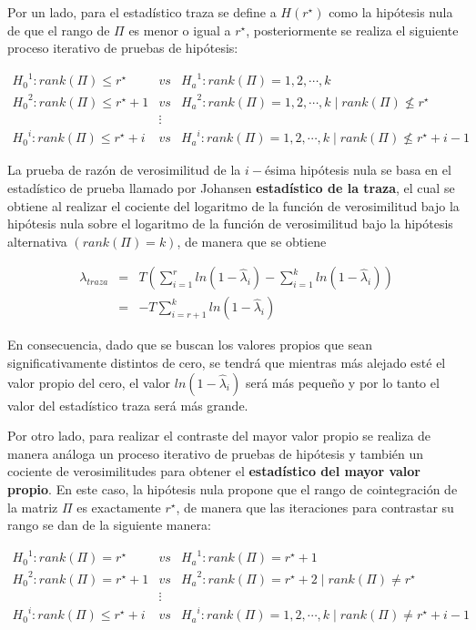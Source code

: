 Por un lado, para el estadístico traza se define a  $H(r^{\star})$ como la hipótesis nula de que el rango de $\Pi$ es menor o igual a $r^{\star}$,  posteriormente se realiza  el siguiente proceso iterativo de pruebas de hipótesis:

\begin{eqnarray}
{H_0}^1: rank(\Pi)\leq r^{\star} & vs & {H_a}^1: rank(\Pi)=1,2,\cdots,k \nonumber \\
 {H_0}^2: rank(\Pi)\leq r^{\star}+1 &vs& {H_a}^2: rank(\Pi)=1,2,\cdots,k \mid rank(\Pi)\nleqslant r^{\star} \nonumber\\
 &\vdots& \nonumber\\
{H_0}^i: rank(\Pi)\leq r^{\star}+i &vs& {H_a}^i: rank(\Pi)=1,2,\cdots,k\mid rank(\Pi)\nleqslant r^{\star}+i-1 \nonumber
\end{eqnarray}

La prueba de razón de verosimilitud de la $i-$ésima hipótesis nula se basa en el estadístico de prueba llamado por Johansen \textbf{estadístico de la traza}, el cual se obtiene al realizar el cociente del logaritmo de la función de verosimilitud bajo la hipótesis nula sobre el logaritmo de la función de verosimilitud bajo la hipótesis alternativa $( rank(\Pi)=k)$, de manera que se obtiene 

\begin{eqnarray}
\lambda_{traza} &=& T\left ( \sum_{i=1}^r ln(1-\widehat{\lambda}_i) - \sum_{i=1}^k ln(1-\widehat{\lambda}_i) \right ) \nonumber \\
 &=& -T \sum_{i=r+1}^k ln(1-\widehat{\lambda}_i) 
\end{eqnarray}

En consecuencia, dado que se buscan los valores propios que sean significativamente distintos de cero, se tendrá que mientras más alejado esté el valor propio del cero, el valor $ln(1-\widehat{\lambda}_i)$ será más pequeño y por lo tanto el valor del estadístico traza será más grande.\bigskip 

Por otro lado, para realizar el contraste del mayor valor propio se realiza de manera análoga un proceso iterativo de pruebas de hipótesis y también un cociente de verosimilitudes para obtener el \textbf{estadístico  del mayor valor propio}. En este caso, la hipótesis nula propone que el rango de cointegración de la matriz $\Pi$ es exactamente $r^{\star}$, de manera que las iteraciones para contrastar su rango se dan de la siguiente manera:

\begin{eqnarray}
{H_0}^1: rank(\Pi) = r^{\star} & vs & {H_a}^1: rank(\Pi)=r^{\star} +1 \nonumber \\
 {H_0}^2: rank(\Pi)= r^{\star}+1 &vs& {H_a}^2: rank(\Pi)=r^{\star}+2 \mid rank(\Pi)\neq r^{\star} \nonumber\\
 &\vdots& \nonumber\\
{H_0}^i: rank(\Pi)\leq r^{\star}+i &vs& {H_a}^i: rank(\Pi)=1,2,\cdots,k\mid rank(\Pi)\neq r^{\star}+i-1 \nonumber
\end{eqnarray}



